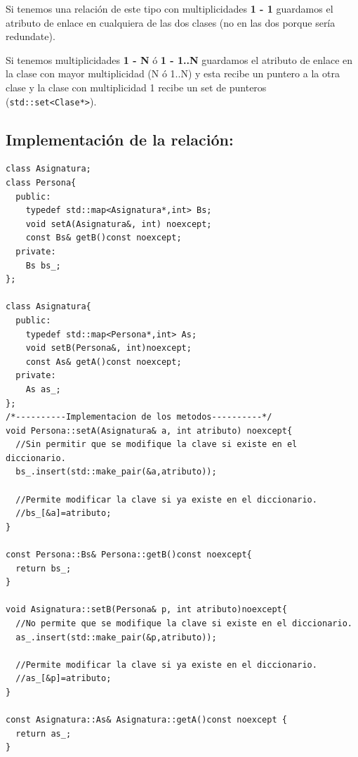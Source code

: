 Si tenemos una relación de este tipo con multiplicidades \textbf{1 - 1} guardamos el atributo de enlace en cualquiera de las dos clases (no en las dos porque sería redundate).

Si tenemos multiplicidades \textbf{1 - N} ó \textbf{1 - 1..N} guardamos el atributo de enlace en la clase con mayor multiplicidad (N ó 1..N) y esta recibe un puntero a la otra clase y la clase con multiplicidad 1 recibe un set de punteros (\texttt{std::set<Clase*>}).
\newpage
\subsection{Implementación de la relación:}

\begin{center}
	\begin{lstlisting}[frame=single]
class Asignatura;
class Persona{
  public:
    typedef std::map<Asignatura*,int> Bs;
    void setA(Asignatura&, int) noexcept;
    const Bs& getB()const noexcept;
  private:
    Bs bs_;
};

class Asignatura{
  public:
    typedef std::map<Persona*,int> As;
    void setB(Persona&, int)noexcept;
    const As& getA()const noexcept;
  private:
    As as_;
};
/*----------Implementacion de los metodos----------*/
void Persona::setA(Asignatura& a, int atributo) noexcept{
  //Sin permitir que se modifique la clave si existe en el diccionario.
  bs_.insert(std::make_pair(&a,atributo));

  //Permite modificar la clave si ya existe en el diccionario.
  //bs_[&a]=atributo;
}

const Persona::Bs& Persona::getB()const noexcept{
  return bs_; 
}

void Asignatura::setB(Persona& p, int atributo)noexcept{
  //No permite que se modifique la clave si existe en el diccionario.
  as_.insert(std::make_pair(&p,atributo));

  //Permite modificar la clave si ya existe en el diccionario.
  //as_[&p]=atributo;
}

const Asignatura::As& Asignatura::getA()const noexcept {
  return as_;
}
\end{lstlisting}
\end{center}